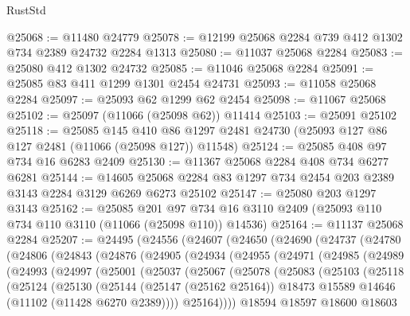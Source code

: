 \begin{lexlean}{RustStd}
\begin{coremodule}
@25068 := @11480 @24779
@25078 := @12199 @25068 @2284 @739 @412 @1302 @734 @2389 @24732 @2284 @1313
@25080 := @11037 @25068 @2284
@25083 := @25080 @412 @1302 @24732
@25085 := @11046 @25068 @2284
@25091 := @25085 @83 @411 @1299 @1301 @2454 @24731
@25093 := @11058 @25068 @2284
@25097 := @25093 @62 @1299 @62 @2454
@25098 := @11067 @25068
@25102 := @25097 (@11066 (@25098 @62)) @11414
@25103 := @25091 @25102
@25118 := @25085
    @145
    @410
    @86
    @1297
    @2481
    @24730
    (@25093 @127 @86 @127 @2481 (@11066 (@25098 @127)) @11548)
@25124 := @25085 @408 @97 @734 @16 @6283 @2409
@25130 := @11367 @25068 @2284 @408 @734 @6277 @6281
@25144 := @14605 @25068 @2284 @83 @1297 @734 @2454 @203 @2389 @3143 @2284 @3129 @6269 @6273 @25102
@25147 := @25080 @203 @1297 @3143
@25162 := @25085
    @201
    @97
    @734
    @16
    @3110
    @2409
    (@25093 @110 @734 @110 @3110 (@11066 (@25098 @110)) @14536)
@25164 := @11137 @25068 @2284
@25207 := @24495
    (@24556
      (@24607
        (@24650
          (@24690
            (@24737
              (@24780
                (@24806
                  (@24843
                    (@24876
                      (@24905
                        (@24934
                          (@24955
                            (@24971
                              (@24985
                                (@24989
                                  (@24993
                                    (@24997
                                      (@25001
                                        (@25037
                                          (@25067
                                            (@25078
                                              (@25083
                                                (@25103
                                                  (@25118
                                                    (@25124
                                                      (@25130
                                                        (@25144
                                                          (@25147 (@25162 @25164))
                                                          @18473
                                                          @15589
                                                          @14646
                                                          (@11102 (@11428 @6270 @2389))))
                                                      @25164))))
                                              @18594
                                              @18597
                                              @18600
                                              @18603

\end{coremodule}
\end{lexlean}
